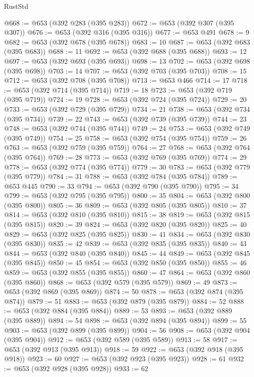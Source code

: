 \begin{lexlean}{RustStd}
\begin{coremodule}
@668 := @653 (@392 @283 (@395 @283))
@672 := @653 (@392 @307 (@395 @307))
@676 := @653 (@392 @316 (@395 @316))
@677 := @653 @491
@678 := 9
@682 := @653 (@392 @678 (@395 @678))
@683 := 10
@687 := @653 (@392 @683 (@395 @683))
@688 := 11
@692 := @653 (@392 @688 (@395 @688))
@693 := 12
@697 := @653 (@392 @693 (@395 @693))
@698 := 13
@702 := @653 (@392 @698 (@395 @698))
@703 := 14
@707 := @653 (@392 @703 (@395 @703))
@708 := 15
@712 := @653 (@392 @708 (@395 @708))
@713 := @653 @466
@714 := 17
@718 := @653 (@392 @714 (@395 @714))
@719 := 18
@723 := @653 (@392 @719 (@395 @719))
@724 := 19
@728 := @653 (@392 @724 (@395 @724))
@729 := 20
@733 := @653 (@392 @729 (@395 @729))
@734 := 21
@738 := @653 (@392 @734 (@395 @734))
@739 := 22
@743 := @653 (@392 @739 (@395 @739))
@744 := 23
@748 := @653 (@392 @744 (@395 @744))
@749 := 24
@753 := @653 (@392 @749 (@395 @749))
@754 := 25
@758 := @653 (@392 @754 (@395 @754))
@759 := 26
@763 := @653 (@392 @759 (@395 @759))
@764 := 27
@768 := @653 (@392 @764 (@395 @764))
@769 := 28
@773 := @653 (@392 @769 (@395 @769))
@774 := 29
@778 := @653 (@392 @774 (@395 @774))
@779 := 30
@783 := @653 (@392 @779 (@395 @779))
@784 := 31
@788 := @653 (@392 @784 (@395 @784))
@789 := @653 @445
@790 := 33
@794 := @653 (@392 @790 (@395 @790))
@795 := 34
@799 := @653 (@392 @795 (@395 @795))
@800 := 35
@804 := @653 (@392 @800 (@395 @800))
@805 := 36
@809 := @653 (@392 @805 (@395 @805))
@810 := 37
@814 := @653 (@392 @810 (@395 @810))
@815 := 38
@819 := @653 (@392 @815 (@395 @815))
@820 := 39
@824 := @653 (@392 @820 (@395 @820))
@825 := 40
@829 := @653 (@392 @825 (@395 @825))
@830 := 41
@834 := @653 (@392 @830 (@395 @830))
@835 := 42
@839 := @653 (@392 @835 (@395 @835))
@840 := 43
@844 := @653 (@392 @840 (@395 @840))
@845 := 44
@849 := @653 (@392 @845 (@395 @845))
@850 := 45
@854 := @653 (@392 @850 (@395 @850))
@855 := 46
@859 := @653 (@392 @855 (@395 @855))
@860 := 47
@864 := @653 (@392 @860 (@395 @860))
@868 := @653 (@392 @579 (@395 @579))
@869 := 49
@873 := @653 (@392 @869 (@395 @869))
@874 := 50
@878 := @653 (@392 @874 (@395 @874))
@879 := 51
@883 := @653 (@392 @879 (@395 @879))
@884 := 52
@888 := @653 (@392 @884 (@395 @884))
@889 := 53
@893 := @653 (@392 @889 (@395 @889))
@894 := 54
@898 := @653 (@392 @894 (@395 @894))
@899 := 55
@903 := @653 (@392 @899 (@395 @899))
@904 := 56
@908 := @653 (@392 @904 (@395 @904))
@912 := @653 (@392 @589 (@395 @589))
@913 := 58
@917 := @653 (@392 @913 (@395 @913))
@918 := 59
@922 := @653 (@392 @918 (@395 @918))
@923 := 60
@927 := @653 (@392 @923 (@395 @923))
@928 := 61
@932 := @653 (@392 @928 (@395 @928))
@933 := 62

\end{coremodule}
\end{lexlean}
